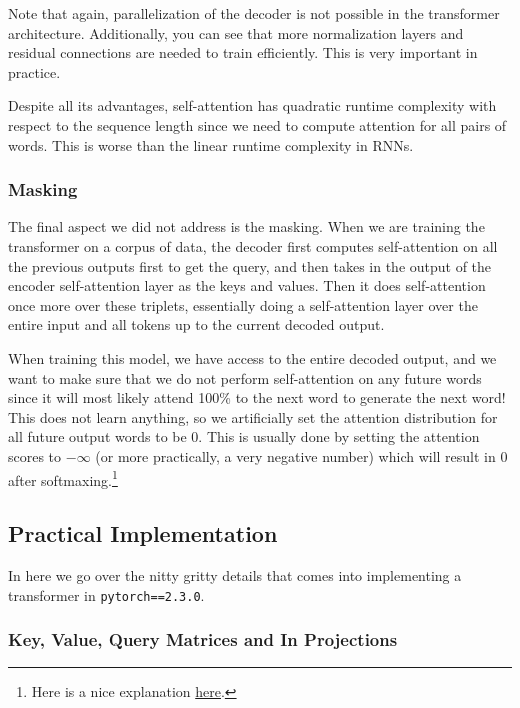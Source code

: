     Note that again, parallelization of the decoder is not possible in the transformer architecture. Additionally, you can see that more normalization layers and residual connections are needed to train efficiently. This is very important in practice. 

    Despite all its advantages, self-attention has quadratic runtime complexity with respect to the sequence length since we need to compute attention for all pairs of words. This is worse than the linear runtime complexity in RNNs.  

  \subsubsection{Masking}

    The final aspect we did not address is the masking. When we are training the transformer on a corpus of data, the decoder first computes self-attention on all the previous outputs first to get the query, and then takes in the output of the encoder self-attention layer as the keys and values. Then it does self-attention once more over these triplets, essentially doing a self-attention layer over the entire input and all tokens up to the current decoded output. 

    When training this model, we have access to the entire decoded output, and we want to make sure that we do not perform self-attention on any future words since it will most likely attend 100\% to the next word to generate the next word! This does not learn anything, so we artificially set the attention distribution for all future output words to be $0$. This is usually done by setting the attention scores to $-\infty$ (or more practically, a very negative number) which will result in $0$ after softmaxing.\footnote{Here is a nice explanation \href{https://stackoverflow.com/questions/58127059/how-to-understand-masked-multi-head-attention-in-transformer}{here}.}

\subsection{Practical Implementation}

  In here we go over the nitty gritty details that comes into implementing a transformer in \texttt{pytorch==2.3.0}. 

  \subsubsection{Key, Value, Query Matrices and In Projections}


